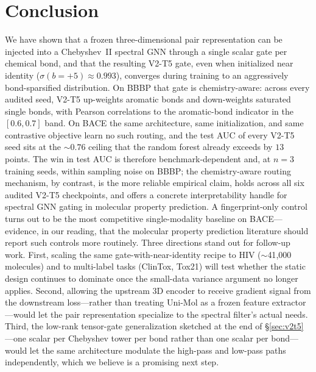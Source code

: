 \documentclass[conference]{IEEEtran}
\begin{document}
\section{Conclusion}
\label{sec:conclusion}

We have shown that a frozen three-dimensional pair representation can be injected into a Chebyshev~II spectral GNN through a single scalar gate per chemical bond, and that the resulting V2-T5 gate, even when initialized near identity ($\sigma(b{=}{+}5)\approx 0.993$), converges during training to an aggressively bond-sparsified distribution. On BBBP that gate is chemistry-aware: across every audited seed, V2-T5 up-weights aromatic bonds and down-weights saturated single bonds, with Pearson correlations to the aromatic-bond indicator in the $[0.6, 0.7]$ band. On BACE the same architecture, same initialization, and same contrastive objective learn no such routing, and the test AUC of every V2-T5 seed sits at the $\sim$$0.76$ ceiling that the random forest already exceeds by $13$ points. The win in test AUC is therefore benchmark-dependent and, at $n{=}3$ training seeds, within sampling noise on BBBP; the chemistry-aware routing mechanism, by contrast, is the more reliable empirical claim, holds across all six audited V2-T5 checkpoints, and offers a concrete interpretability handle for spectral GNN gating in molecular property prediction. A fingerprint-only control turns out to be the most competitive single-modality baseline on BACE---evidence, in our reading, that the molecular property prediction literature should report such controls more routinely. Three directions stand out for follow-up work. First, scaling the same gate-with-near-identity recipe to HIV ($\sim$41{,}000 molecules) and to multi-label tasks (ClinTox, Tox21) will test whether the static design continues to dominate once the small-data variance argument no longer applies. Second, allowing the upstream 3D encoder to receive gradient signal from the downstream loss---rather than treating Uni-Mol as a frozen feature extractor---would let the pair representation specialize to the spectral filter's actual needs. Third, the low-rank tensor-gate generalization sketched at the end of \S\ref{sec:v2t5}---one scalar per Chebyshev tower per bond rather than one scalar per bond---would let the same architecture modulate the high-pass and low-pass paths independently, which we believe is a promising next step.
\end{document}

